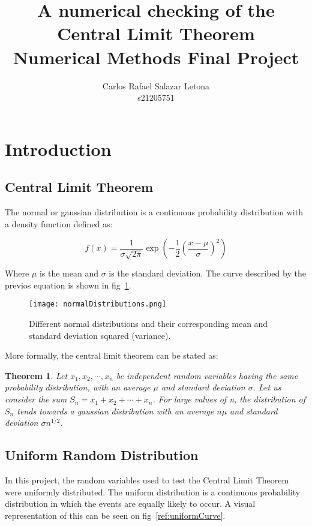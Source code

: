 \documentclass[12pt]{article}
\newtheorem{theorem}{Theorem}
\begin{document}
\title{A numerical checking of the Central Limit Theorem \\ Numerical Methods Final Project}
\author{Carlos Rafael Salazar Letona \\ s21205751}
\maketitle

\section*{Introduction}

\subsection*{Central Limit Theorem}
The normal or gaussian distribution is a continuous probability distribution with a density function defined as:

\begin{equation}
	f(x) = \frac{1}{\sigma \sqrt{2 \pi}} \exp \left( -\frac{1}{2} {\left( \frac{x - \mu}{\sigma}\right)}^{2}\right)
\end{equation}

Where \(\mu\) is the mean and \(\sigma\) is the standard deviation\cite{ref:normalWiki}. The curve described by the previos equation is shown in fig~\ref{ref:normalCurve}.

\begin{figure}[H]
	\centering
	\texttt{[image: normalDistributions.png]}
	\caption{Different normal distributions and their corresponding mean and standard deviation squared (variance)\cite{ref:normalWiki}.}
	\label{ref:normalCurve}
\end{figure}

More formally, the central limit theorem can be stated as:

\begin{theorem}
	Let \(x_{1}, x_{2}, \cdots, x_{n}\) be independent random variables having the same probability distribution, with an average \(\mu\) and standard deviation \(\sigma\). Let us consider the sum \(S_{n} = x_{1} + x_{2} + \cdots + x_{n}\). For large values of n, the distribution of \(S_{n}\) tends towards a gaussian distribution with an average \(n \mu\) and standard deviation \(\sigma n^{1/2}\).
\end{theorem}

\subsection*{Uniform Random Distribution}
In this project, the random variables used to test the Central Limit Theorem were uniformly distributed. The uniform distribution is a continuous probability distribution in which the events are equally likely to occur. A visual representation of this can be seen on fig~\ref{ref:uniformCurve}.
\end{document}

